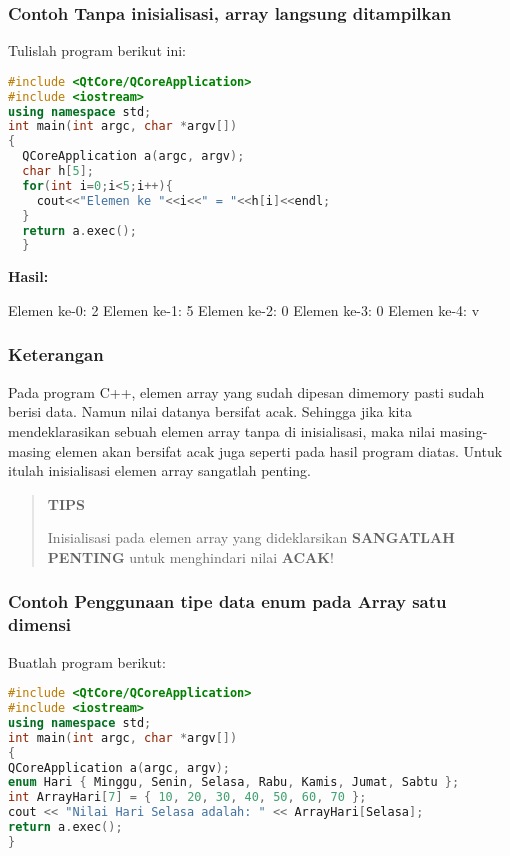 \subsubsection*{Contoh  Tanpa inisialisasi, array langsung ditampilkan}

Tulislah program berikut ini:

\begin{lstlisting}[language=c++, caption=Tanpa inisialisasi array langsung ditampilkan, label=contoh3-6]
#include <QtCore/QCoreApplication>
#include <iostream>
using namespace std;
int main(int argc, char *argv[])
{
  QCoreApplication a(argc, argv);
  char h[5];
  for(int i=0;i<5;i++){
    cout<<"Elemen ke "<<i<<" = "<<h[i]<<endl;
  }
  return a.exec();
  }
\end{lstlisting}

\textbf{Hasil:}

\begin{lcverbatim}
Elemen ke-0: 2
Elemen ke-1: 5
Elemen ke-2: 0
Elemen ke-3: 0
Elemen ke-4: v
\end{lcverbatim}

\subsubsection*{Keterangan}

Pada program C++, elemen array yang sudah dipesan dimemory pasti sudah
berisi data. Namun nilai datanya bersifat acak. Sehingga jika kita
mendeklarasikan sebuah elemen array tanpa di inisialisasi, maka nilai
masing-masing elemen akan bersifat acak juga seperti pada hasil program
diatas. Untuk itulah inisialisasi elemen array sangatlah penting.

\begin{quotation}
{\LARGE {}}  \textbf{TIPS}
 
 Inisialisasi pada elemen array yang dideklarsikan \textbf{SANGATLAH
 PENTING} untuk menghindari nilai \textbf{ACAK}!
\end{quotation}


\subsubsection*{Contoh  Penggunaan tipe data enum pada Array satu dimensi}

Buatlah program berikut:

\begin{lstlisting}[language=c++, caption=Penggunaan tipe data enum pada Array satu dimensi, label=contoh3-7]
#include <QtCore/QCoreApplication>
#include <iostream>
using namespace std;
int main(int argc, char *argv[])
{
QCoreApplication a(argc, argv);
enum Hari { Minggu, Senin, Selasa, Rabu, Kamis, Jumat, Sabtu };
int ArrayHari[7] = { 10, 20, 30, 40, 50, 60, 70 };
cout << "Nilai Hari Selasa adalah: " << ArrayHari[Selasa];
return a.exec();
}
\end{lstlisting}


